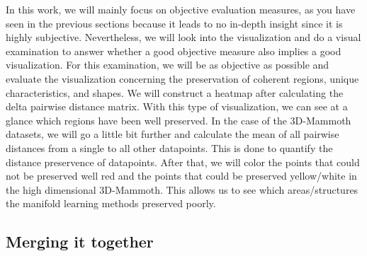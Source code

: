 In this work, we will mainly focus on objective evaluation measures, as you have seen in the previous sections because it leads to no in-depth insight since it is highly subjective. Nevertheless, we will look into the visualization and do a visual examination to answer whether a good objective measure also implies a good visualization. For this examination, we will be as objective as possible and evaluate the visualization concerning the preservation of coherent regions, unique characteristics, and shapes.
We will construct a heatmap after calculating the delta pairwise distance matrix. With this type of visualization, we can see at a glance which regions have been well preserved. In the case of the 3D-Mammoth datasets, we will go a little bit further and calculate the mean of all pairwise distances from a single to all other datapoints. This is done to quantify the distance preservence of datapoints. After that, we will color the points that could not be preserved well red and the points that could be preserved yellow/white in the high dimensional 3D-Mammoth. This allows us to see which areas/structures the manifold learning methods preserved poorly. \cite{Gisbrecht15}

\subsection{Merging it together} \label{subsec:merging}

